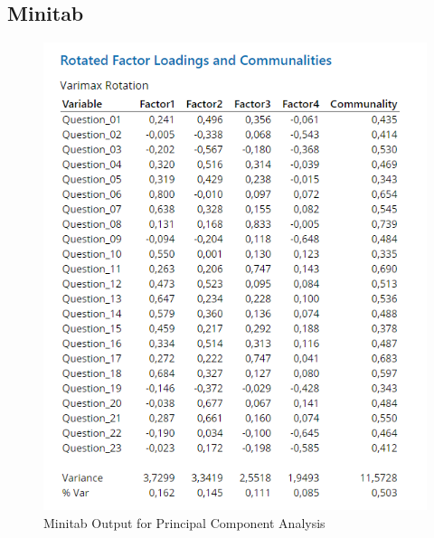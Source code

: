 \documentclass[
]{book}
\begin{document}
\hypertarget{minitab}{%
\subsection{Minitab}\label{minitab}}

\begin{figure}[!h]
\includegraphics{Screenshots/Principal Component Analysis/pcaMinitab1} \caption{\label{fig:pcaMinitab}Minitab Output for Principal Component Analysis}\label{fig:pcaMinitab}
\end{figure}
\end{document}
